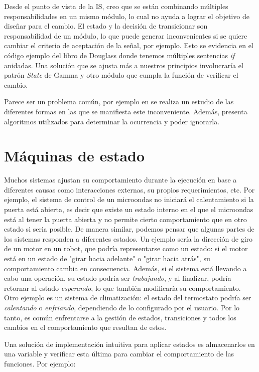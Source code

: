 Desde el punto de vista de la IS, creo que se están combinando múltiples responsabilidades en un mismo módulo, lo cual no ayuda a lograr el objetivo de diseñar para el cambio. El estado y la decisión de transicionar son responsabilidad de un módulo, lo que puede generar inconvenientes si se quiere cambiar el criterio de aceptación de la señal, por ejemplo. Esto se evidencia en el código ejemplo del libro de Douglass donde tenemos múltiples sentencias \textit{if} anidadas. Una solución que se ajusta más a nuestros principios involucraría el patrón \textit{State} de Gamma y otro módulo que cumpla la función de verificar el cambio.

Parece ser un problema común, por ejemplo en \cite{ganssleDebouncing} se realiza un estudio de las diferentes formas en las que se manifiesta este inconveniente. Además, presenta algoritmos utilizados para determinar la ocurrencia y poder ignorarla.

\section{Máquinas de estado}\label{cap:state}


Muchos sistemas ajustan su comportamiento durante la ejecución en base a diferentes causas como interacciones externas, su propios requerimientos, etc. Por ejemplo, el sistema de control de un microondas no iniciará el calentamiento si la puerta está abierta, es decir que existe un estado interno en el que el microondas está al tener la puerta abierta y no permite cierto comportamiento que en otro estado si seria posible. De manera similar, podemos pensar que algunas partes de los sistemas responden a diferentes estados. Un ejemplo sería la dirección de giro de un motor en un robot, que podría representarse como un estado: si el motor está en un estado de "girar hacia adelante" o "girar hacia atrás", su comportamiento cambia en consecuencia. Además, si el sistema está llevando a cabo una operación, su estado podría ser \textit{trabajando}, y al finalizar, podría retornar al estado \textit{esperando}, lo que también modificaría su comportamiento. Otro ejemplo es un sistema de climatización: el estado del termostato podría ser \textit{calentando} o \textit{enfriando}, dependiendo de lo configurado por el usuario. Por lo tanto, es común enfrentarse a la gestión de estados, transiciones y todos los cambios en el comportamiento que resultan de estos.

Una solución de implementación intuitiva para aplicar estados es almacenarlos en una variable y verificar esta última para cambiar el comportamiento de las funciones. Por ejemplo:

